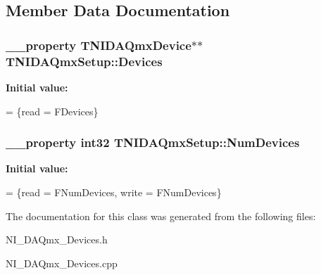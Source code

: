 \subsection{Member Data Documentation}
\hypertarget{class_t_n_i_d_a_qmx_setup_a15b73f85f5b035161004c6dedf826a50}{
\subsubsection[{Devices}]{\setlength{\rightskip}{0pt plus 5cm}\+\_\+\+\_\+property {\bf T\+N\+I\+D\+A\+Qmx\+Device}$\ast$$\ast$ T\+N\+I\+D\+A\+Qmx\+Setup\+::\+Devices}}\label{class_t_n_i_d_a_qmx_setup_a15b73f85f5b035161004c6dedf826a50}
{\bfseries Initial value\+:}
\begin{DoxyCode}
=
                \{read = FDevices\}
\end{DoxyCode}
\hypertarget{class_t_n_i_d_a_qmx_setup_a5390e926dc899869d03c7d7cee8d9686}{
\subsubsection[{Num\+Devices}]{\setlength{\rightskip}{0pt plus 5cm}\+\_\+\+\_\+property int32 T\+N\+I\+D\+A\+Qmx\+Setup\+::\+Num\+Devices}}\label{class_t_n_i_d_a_qmx_setup_a5390e926dc899869d03c7d7cee8d9686}
{\bfseries Initial value\+:}
\begin{DoxyCode}
=
                \{read = FNumDevices, write = FNumDevices\}
\end{DoxyCode}


The documentation for this class was generated from the following files\+:\begin{DoxyCompactItemize}
\item 
N\+I\+\_\+\+D\+A\+Qmx\+\_\+\+Devices.\+h\item 
N\+I\+\_\+\+D\+A\+Qmx\+\_\+\+Devices.\+cpp\end{DoxyCompactItemize}
